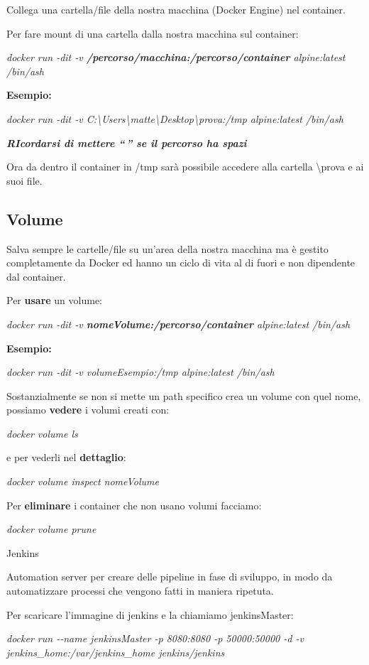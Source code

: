 Collega una cartella/file della nostra macchina (Docker Engine) nel
container.

Per fare mount di una cartella dalla nostra macchina sul container:

\emph{docker run -dit -v \textbf{/percorso/macchina:/percorso/container}
alpine:latest /bin/ash}

\textbf{Esempio:}

\emph{docker run -dit -v
C:\textbackslash Users\textbackslash matte\textbackslash Desktop\textbackslash prova:/tmp
alpine:latest /bin/ash}

\emph{\textbf{RIcordarsi di mettere ``\,'' se il percorso ha spazi}}

Ora da dentro il container in /tmp sarà possibile accedere alla cartella
\textbackslash prova e ai suoi file.

\subsection{Volume}\label{volume}

Salva sempre le cartelle/file su un'area della nostra macchina ma è
gestito completamente da Docker ed hanno un ciclo di vita al di fuori e
non dipendente dal container.

Per \textbf{usare} un volume:

\emph{docker run -dit -v \textbf{nomeVolume:/percorso/container}
alpine:latest /bin/ash}

\textbf{Esempio:}

\emph{docker run -dit -v volumeEsempio:/tmp alpine:latest /bin/ash}

Sostanzialmente se non si mette un path specifico crea un volume con
quel nome, possiamo \textbf{vedere} i volumi creati con:

\emph{docker volume ls}

e per vederli nel \textbf{dettaglio}:

\emph{docker volume inspect nomeVolume}

Per \textbf{eliminare} i container che non usano volumi facciamo:

\emph{docker volume prune}

Jenkins

Automation server per creare delle pipeline in fase di sviluppo, in modo
da automatizzare processi che vengono fatti in maniera ripetuta.

Per scaricare l'immagine di jenkins e la chiamiamo jenkinsMaster:

\emph{docker run -\/-name jenkinsMaster -p 8080:8080 -p 50000:50000 -d
-v jenkins\_home:/var/jenkins\_home jenkins/jenkins}

